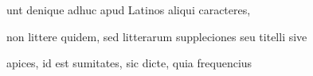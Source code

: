 unt denique adhuc apud Latinos aliqui caracteres,

non littere quidem, sed litterarum suppleciones seu titelli sive

apices, id est sumitates, sic dicte, quia frequencius



















